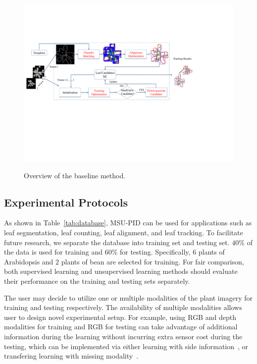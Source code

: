 \begin{figure}[t!]
\centering
\includegraphics[width=.98\textwidth]{Figures/overview}\\
\caption{Overview of the baseline method.}
\label{fig:methodOverview}
\end{figure}

\subsection{Experimental Protocols}
\label{sec:protocol}
As shown in Table~\ref{tab:database}, MSU-PID can be used for applications such as leaf segmentation, leaf counting, leaf alignment, and leaf tracking.
To facilitate future research, we separate the database into training set and testing set.
$40\%$ of the data is used for training and $60\%$ for testing.
Specifically, $6$ plants of Arabidopsis and $2$ plants of bean are selected for training.
For fair comparison, both supervised learning and unsupervised learning methods should evaluate their performance on the training and testing sets separately.

The user may decide to utilize one or multiple modalities of the plant imagery for training and testing respectively.
The availability of multiple modalities allows user to design novel experimental setup.
For example, using RGB and depth modalities for training and RGB for testing can take advantage of additional information during the learning without incurring extra sensor cost during the testing, which can be implemented via either learning with side information~\cite{chen2013boosting}, or transfering learning with missing modality~\cite{ding2014latent,Chen2013b}.


